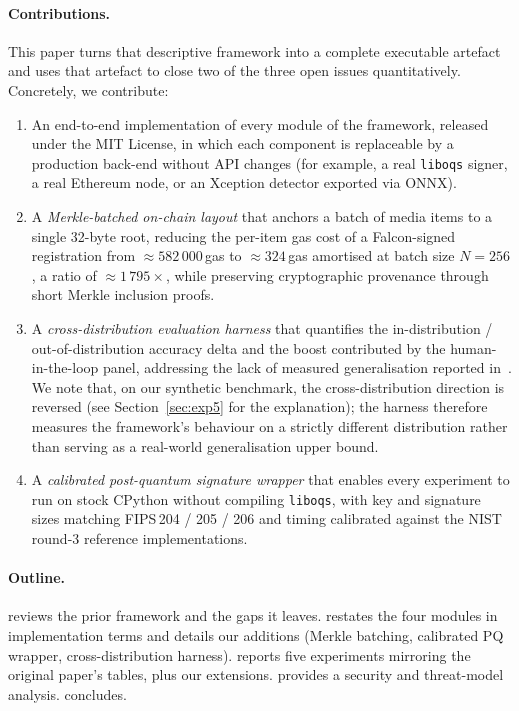 \documentclass[11pt,a4paper]{article}
\theoremstyle{definition}
\theoremstyle{plain}
\theoremstyle{remark}
\begin{document}
\paragraph{Contributions.}
This paper turns that descriptive framework into a complete
executable artefact and uses that artefact to close two of the
three open issues quantitatively. Concretely, we contribute:
\begin{enumerate}[leftmargin=*]
    \item An end-to-end implementation of every module of the
    framework, released under the MIT License, in which each
    component is replaceable by a production back-end without
    API changes (for example, a real \texttt{liboqs} signer, a
    real Ethereum node, or an Xception detector exported via
    ONNX).
    \item A \emph{Merkle-batched on-chain layout} that anchors a
    batch of media items to a single 32-byte root, reducing the
    per-item gas cost of a Falcon-signed registration from
    $\approx\!582\,000$\,gas to $\approx\!324$\,gas amortised at
    batch size $N{=}256$, a ratio of $\approx\!1\,795\times$,
    while preserving cryptographic provenance through short
    Merkle inclusion proofs.
    \item A \emph{cross-distribution evaluation harness} that
    quantifies the in-distribution / out-of-distribution accuracy
    delta and the boost contributed by the human-in-the-loop
    panel, addressing the lack of measured generalisation
    reported in~\cite{bib4}. We note that, on our synthetic
    benchmark, the cross-distribution direction is reversed (see
    Section~\ref{sec:exp5} for the explanation); the harness
    therefore measures the framework's behaviour on a strictly
    different distribution rather than serving as a real-world
    generalisation upper bound.
    \item A \emph{calibrated post-quantum signature wrapper} that
    enables every experiment to run on stock CPython without
    compiling \texttt{liboqs}, with key and signature sizes
    matching FIPS\,204 / 205 / 206 and timing calibrated against
    the NIST round-3 reference implementations.
\end{enumerate}

\paragraph{Outline.}
 reviews the prior framework and the gaps it
leaves.  restates the four modules in
implementation terms and details our additions (Merkle batching,
calibrated PQ wrapper, cross-distribution harness).
 reports five experiments mirroring the
original paper's tables, plus our extensions.
 provides a security and threat-model analysis.
 concludes.
\end{document}
